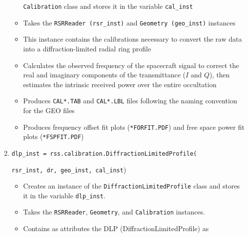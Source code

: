 \documentclass[titlepage, 12pt]{article}
\begin{document}
\begin{enumerate}
\begin{itemize}
                                \texttt{Calibration} class and stores it in
                                the variable \texttt{cal\_inst} 
                          \item Takes the \texttt{RSRReader (rsr\_inst)}
                                and \texttt{Geometry (geo\_inst)} instances
                          \item This instance contains the calibrations
                                necessary to convert the raw data into a
                                diffraction-limited radial ring profile
                          \item Calculates the observed frequency of the
                                spacecraft signal to correct the real and
                                imaginary components of the transmittance
                                ($I$ and $Q$), then estimates the intrinsic
                                received power over the entire occultation
                          \item Produces \texttt{CAL*.TAB} and 
                                \texttt{CAL*.LBL} files following the
                                naming convention for the GEO files
                          \item Produces frequency offset fit
                                plots (\texttt{*FORFIT.PDF}) and free space
                                power fit plots (\texttt{*FSPFIT.PDF})
                      \end{itemize}
                \item \small{\texttt{dlp\_inst =
                                     rss.calibration.DiffractionLimitedProfile(}}
                      \par\hspace{4ex}
                      \small{\texttt{rsr\_inst, dr, geo\_inst, cal\_inst})}
                      \normalsize
                      \begin{itemize}
                          \item Creates an instance of the
                                \texttt{DiffractionLimitedProfile} class and
                                stores it in the variable \texttt{dlp\_inst}.
                          \item Takes the \texttt{RSRReader}, \texttt{Geometry},
                                and \texttt{Calibration} instances.
                          \item Contains as attributes the DLP (DiffractionLimitedProfile) as

\end{itemize}
\end{enumerate}
\end{document}
